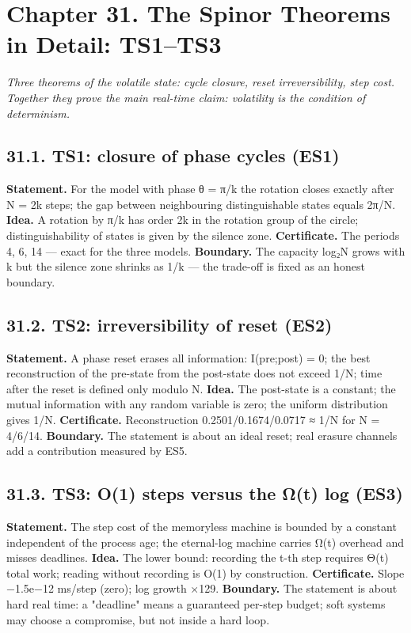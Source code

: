 \documentclass[11pt,a4paper]{article}
\begin{document}
\section{Chapter 31. The Spinor Theorems in Detail: TS1–TS3}

\noindent\textit{\color{copper}Three theorems of the volatile state: cycle closure, reset irreversibility, step cost. Together they prove the main real-time claim: volatility is the condition of determinism.}

\subsection{31.1. TS1: closure of phase cycles (ES1)}

\textbf{Statement.} For the model with phase θ = π/k the rotation closes exactly after N = 2k steps; the gap between neighbouring distinguishable states equals 2π/N. \textbf{Idea.} A rotation by π/k has order 2k in the rotation group of the circle; distinguishability of states is given by the silence zone. \textbf{Certificate.} The periods 4, 6, 14 — exact for the three models. \textbf{Boundary.} The capacity log₂N grows with k but the silence zone shrinks as 1/k — the trade-off is fixed as an honest boundary.

\subsection{31.2. TS2: irreversibility of reset (ES2)}

\textbf{Statement.} A phase reset erases all information: I(pre;post) = 0; the best reconstruction of the pre-state from the post-state does not exceed 1/N; time after the reset is defined only modulo N. \textbf{Idea.} The post-state is a constant; the mutual information with any random variable is zero; the uniform distribution gives 1/N. \textbf{Certificate.} Reconstruction 0.2501/0.1674/0.0717 ≈ 1/N for N = 4/6/14. \textbf{Boundary.} The statement is about an ideal reset; real erasure channels add a contribution measured by ES5.

\subsection{31.3. TS3: O(1) steps versus the Ω(t) log (ES3)}

\textbf{Statement.} The step cost of the memoryless machine is bounded by a constant independent of the process age; the eternal-log machine carries Ω(t) overhead and misses deadlines. \textbf{Idea.} The lower bound: recording the t-th step requires Θ(t) total work; reading without recording is O(1) by construction. \textbf{Certificate.} Slope −1.5e−12 ms/step (zero); log growth ×129. \textbf{Boundary.} The statement is about hard real time: a "deadline" means a guaranteed per-step budget; soft systems may choose a compromise, but not inside a hard loop.
\end{document}
